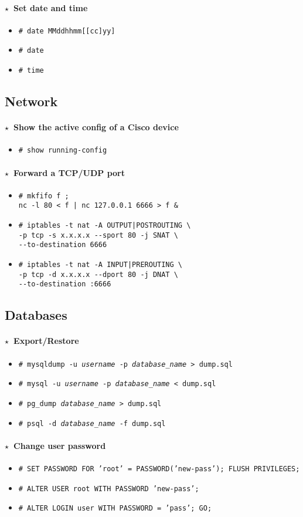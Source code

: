 \documentclass[10pt,landscape]{article}
\newcommand{\os}[1]{\texttt{\footnotesize{#1}}}
\newcommand{\unix}{\os{U}}
\newcommand{\linux}{\os{L}}
\newcommand{\windows}{\os{W}}
\newenvironment{action}[1]
  {\paragraph{$\star$~#1}\begin{itemize}[leftmargin=1cm]}
  {\end{itemize}}
\newcommand{\cmd}[2]{\item[#1] {\small\tt\# #2}}
\newcommand{\app}[1]{\footnotesize\sc{#1}}
\begin{document}
\begin{multicols*}{3}
\begin{action}{Set date and time}
\cmd{\unix}{date MMddhhmm[[cc]yy]}
\cmd{\windows}{date}
\cmd{\windows}{time}
\end{action}

\subsection*{Network}

\newcommand{\cisco}{\app{cisco}}

\begin{action}{Show the active config of a Cisco device}
\cmd{\cisco}{show running-config}
\end{action}

\begin{action}{Forward a TCP/UDP port}
\cmd{\unix}{mkfifo f ;\\
nc -l 80 < f | nc 127.0.0.1 6666 > f \&}
\cmd{\linux}{iptables -t nat -A OUTPUT|POSTROUTING \textbackslash\\
  -p tcp -s x.x.x.x -{}-sport 80 -j SNAT \textbackslash\\
  -{}-to-destination 6666}
\cmd{\linux}{iptables -t nat -A INPUT|PREROUTING \textbackslash\\
  -p tcp -d x.x.x.x -{}-dport 80 -j DNAT \textbackslash\\
  -{}-to-destination :6666}
\end{action}

\subsection*{Databases}

\newcommand{\mysql}{\app{mysql}}
\newcommand{\postgres}{\app{psql}}
\newcommand{\mssql}{\app{mssql}}

\begin{action}{Export/Restore}
\cmd{\unix}{mysqldump -u \emph{username} -p \emph{database\_name} > dump.sql}
\cmd{\unix}{mysql -u \emph{username} -p \emph{database\_name} < dump.sql}
\cmd{\unix}{pg\_dump \emph{database\_name} > dump.sql}
\cmd{\unix}{psql -d \emph{database\_name} -f dump.sql}
\end{action}

\begin{action}{Change user password}
\cmd{\mysql}{SET PASSWORD FOR 'root' = PASSWORD('new-pass'); FLUSH PRIVILEGES;}
\cmd{\postgres}{ALTER USER root WITH PASSWORD 'new-pass';}
\cmd{\mssql}{ALTER LOGIN user WITH PASSWORD = 'pass'; GO;}
\end{action}


\end{multicols*}
\end{document}
